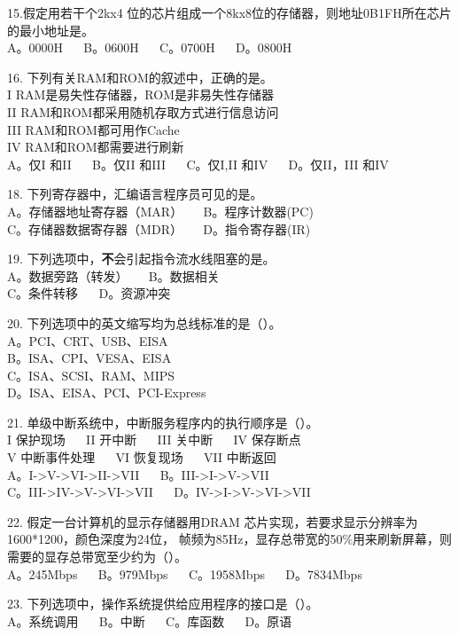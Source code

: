 15.假定用若干个2kx4 位的芯片组成一个8kx8位的存储器，则地址0B1FH所在芯片的最小地址是。 \\
A。0000H $\quad$ B。0600H $\quad$ C。0700H $\quad$ D。0800H

16. 下列有关RAM和ROM的叙述中，正确的是。 \\
I RAM是易失性存储器，ROM是非易失性存储器 \\
II RAM和ROM都采用随机存取方式进行信息访问 \\
III RAM和ROM都可用作Cache \\
IV RAM和ROM都需要进行刷新 \\
A。仅I 和II $\quad$ B。仅II 和III $\quad$ C。仅I,II 和IV $\quad$ D。仅II，III 和IV

18. 下列寄存器中，汇编语言程序员可见的是。 \\
A。存储器地址寄存器（MAR） $\quad$ B。程序计数器(PC) \\
C。存储器数据寄存器（MDR） $\quad$ D。指令寄存器(IR)

19. 下列选项中，\textbf{不}会引起指令流水线阻塞的是。 \\
A。数据旁路（转发） $\quad$ B。数据相关 \\
C。条件转移 $\quad$ D。资源冲突

20. 下列选项中的英文缩写均为总线标准的是（）。 \\
A。PCI、CRT、USB、EISA \\
B。ISA、CPI、VESA、EISA \\
C。ISA、SCSI、RAM、MIPS \\
D。ISA、EISA、PCI、PCI-Express

21. 单级中断系统中，中断服务程序内的执行顺序是（）。 \\
I 保护现场 $\quad$ II 开中断 $\quad$ III 关中断 $\quad$ IV 保存断点 \\
V 中断事件处理 $\quad$ VI 恢复现场 $\quad$ VII 中断返回 \\
A。I->V->VI->II->VII $\quad$ B。III->I->V->VII \\
C。III->IV->V->VI->VII $\quad$ D。IV->I->V->VI->VII

22. 假定一台计算机的显示存储器用DRAM 芯片实现，若要求显示分辨率为1600*1200，颜色深度为24位，
帧频为85Hz，显存总带宽的50\%用来刷新屏幕，则需要的显存总带宽至少约为（）。 \\
A。245Mbps $\quad$ B。979Mbps $\quad$ C。1958Mbps $\quad$ D。7834Mbps

23. 下列选项中，操作系统提供给应用程序的接口是（）。 \\
A。系统调用 $\quad$ B。中断 $\quad$ C。库函数 $\quad$ D。原语

